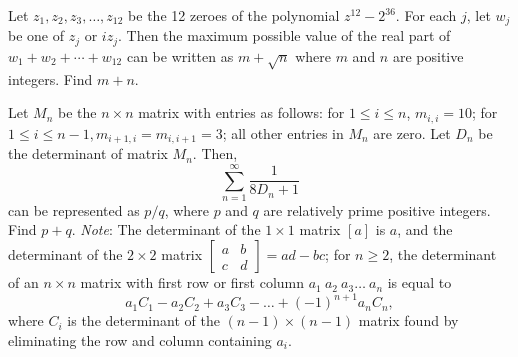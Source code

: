 \begin{question}[name={2011 AIME II, \href{https://artofproblemsolving.com/community/c4p2224415}{Problem 8}}]
	Let $z_1,z_2,z_3,\dots,z_{12}$ be the 12 zeroes of the polynomial $z^{12}-2^{36}$. For each $j$, let $w_j$ be one of $z_j$ or $i z_j$. Then the maximum possible value of the real part of $w_1+w_2+\cdots+w_{12}$ can be written as $m+\sqrt{n}$ where $m$ and $n$ are positive integers. Find $m+n$.	
	
\end{question}


%	














\begin{question}[name={2011 AIME II, \href{https://artofproblemsolving.com/community/c4p2224432}{Problem 11}}]
	Let $M_n$ be the $n\times n$ matrix with entries as follows: for $1\leq i \leq n$, $m_{i,i}=10$; for $1\leq i \leq n-1, m_{i+1,i}=m_{i,i+1}=3$; all other entries in $M_n$ are zero. Let $D_n$ be the determinant of matrix $M_n$. Then, $$\displaystyle \sum_{n=1}^{\infty} \dfrac{1}{8D_n+1}$$ can be represented as ${p}/{q}$, where $p$ and $q$ are relatively prime positive integers. Find $p+q$. \textit{Note}: The determinant of the $1\times 1$ matrix $[a]$ is $a$, and the determinant of the $2\times 2$ matrix $\left[ \begin{array}{cc} a & b \\ c & d \end{array} \right]=ad-bc$; for $n\geq 2$, the determinant of an $n\times n$ matrix with first row or first column $a_1\ a_2\ a_3 \dots\ a_n$ is equal to $$a_1C_1 - a_2C_2 + a_3C_3 - \dots + (-1)^{n+1} a_nC_n,$$ where $C_i$ is the determinant of the $(n-1)\times (n-1)$ matrix found by eliminating the row and column containing $a_i$.
\end{question}


%	










